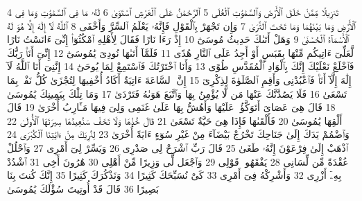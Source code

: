 {\tiny\colorbox{cl_aya}{4}} تَنزِيلًا مِّمَّنْ خَلَقَ ٱلْأَرْضَ وَٱلسَّمَٰوَٰتِ ٱلْعُلَى
{\tiny\colorbox{cl_aya}{5}} ٱلرَّحْمَٰنُ عَلَى ٱلْعَرْشِ ٱسْتَوَىٰ
{\tiny\colorbox{cl_aya}{6}} لَهُۥ مَا فِى ٱلسَّمَٰوَٰتِ وَمَا فِى ٱلْأَرْضِ وَمَا بَيْنَهُمَا وَمَا تَحْتَ ٱلثَّرَىٰ
{\tiny\colorbox{cl_aya}{7}} وَإِن تَجْهَرْ بِٱلْقَوْلِ فَإِنَّهُۥ يَعْلَمُ ٱلسِّرَّ وَأَخْفَى
{\tiny\colorbox{cl_aya}{8}} ٱللَّهُ لَآ إِلَٰهَ إِلَّا هُوَ لَهُ ٱلْأَسْمَآءُ ٱلْحُسْنَىٰ
{\tiny\colorbox{cl_aya}{9}} وَهَلْ أَتَىٰكَ حَدِيثُ مُوسَىٰٓ
{\tiny\colorbox{cl_aya}{10}} إِذْ رَءَا نَارًا فَقَالَ لِأَهْلِهِ ٱمْكُثُوٓا۟ إِنِّىٓ ءَانَسْتُ نَارًا لَّعَلِّىٓ ءَاتِيكُم مِّنْهَا بِقَبَسٍ أَوْ أَجِدُ عَلَى ٱلنَّارِ هُدًى
{\tiny\colorbox{cl_aya}{11}} فَلَمَّآ أَتَىٰهَا نُودِىَ يَٰمُوسَىٰٓ
{\tiny\colorbox{cl_aya}{12}} إِنِّىٓ أَنَا۠ رَبُّكَ فَٱخْلَعْ نَعْلَيْكَ إِنَّكَ بِٱلْوَادِ ٱلْمُقَدَّسِ طُوًى
{\tiny\colorbox{cl_aya}{13}} وَأَنَا ٱخْتَرْتُكَ فَٱسْتَمِعْ لِمَا يُوحَىٰٓ
{\tiny\colorbox{cl_aya}{14}} إِنَّنِىٓ أَنَا ٱللَّهُ لَآ إِلَٰهَ إِلَّآ أَنَا۠ فَٱعْبُدْنِى وَأَقِمِ ٱلصَّلَوٰةَ لِذِكْرِىٓ
{\tiny\colorbox{cl_aya}{15}} إِنَّ ٱلسَّاعَةَ ءَاتِيَةٌ أَكَادُ أُخْفِيهَا لِتُجْزَىٰ كُلُّ نَفْسٍۭ بِمَا تَسْعَىٰ
{\tiny\colorbox{cl_aya}{16}} فَلَا يَصُدَّنَّكَ عَنْهَا مَن لَّا يُؤْمِنُ بِهَا وَٱتَّبَعَ هَوَىٰهُ فَتَرْدَىٰ
{\tiny\colorbox{cl_aya}{17}} وَمَا تِلْكَ بِيَمِينِكَ يَٰمُوسَىٰ
{\tiny\colorbox{cl_aya}{18}} قَالَ هِىَ عَصَاىَ أَتَوَكَّؤُا۟ عَلَيْهَا وَأَهُشُّ بِهَا عَلَىٰ غَنَمِى وَلِىَ فِيهَا مَـَٔارِبُ أُخْرَىٰ
{\tiny\colorbox{cl_aya}{19}} قَالَ أَلْقِهَا يَٰمُوسَىٰ
{\tiny\colorbox{cl_aya}{20}} فَأَلْقَىٰهَا فَإِذَا هِىَ حَيَّةٌ تَسْعَىٰ
{\tiny\colorbox{cl_aya}{21}} قَالَ خُذْهَا وَلَا تَخَفْ سَنُعِيدُهَا سِيرَتَهَا ٱلْأُولَىٰ
{\tiny\colorbox{cl_aya}{22}} وَٱضْمُمْ يَدَكَ إِلَىٰ جَنَاحِكَ تَخْرُجْ بَيْضَآءَ مِنْ غَيْرِ سُوٓءٍ ءَايَةً أُخْرَىٰ
{\tiny\colorbox{cl_aya}{23}} لِنُرِيَكَ مِنْ ءَايَٰتِنَا ٱلْكُبْرَى
{\tiny\colorbox{cl_aya}{24}} ٱذْهَبْ إِلَىٰ فِرْعَوْنَ إِنَّهُۥ طَغَىٰ
{\tiny\colorbox{cl_aya}{25}} قَالَ رَبِّ ٱشْرَحْ لِى صَدْرِى
{\tiny\colorbox{cl_aya}{26}} وَيَسِّرْ لِىٓ أَمْرِى
{\tiny\colorbox{cl_aya}{27}} وَٱحْلُلْ عُقْدَةً مِّن لِّسَانِى
{\tiny\colorbox{cl_aya}{28}} يَفْقَهُوا۟ قَوْلِى
{\tiny\colorbox{cl_aya}{29}} وَٱجْعَل لِّى وَزِيرًا مِّنْ أَهْلِى
{\tiny\colorbox{cl_aya}{30}} هَٰرُونَ أَخِى
{\tiny\colorbox{cl_aya}{31}} ٱشْدُدْ بِهِۦٓ أَزْرِى
{\tiny\colorbox{cl_aya}{32}} وَأَشْرِكْهُ فِىٓ أَمْرِى
{\tiny\colorbox{cl_aya}{33}} كَىْ نُسَبِّحَكَ كَثِيرًا
{\tiny\colorbox{cl_aya}{34}} وَنَذْكُرَكَ كَثِيرًا
{\tiny\colorbox{cl_aya}{35}} إِنَّكَ كُنتَ بِنَا بَصِيرًا
{\tiny\colorbox{cl_aya}{36}} قَالَ قَدْ أُوتِيتَ سُؤْلَكَ يَٰمُوسَىٰ
